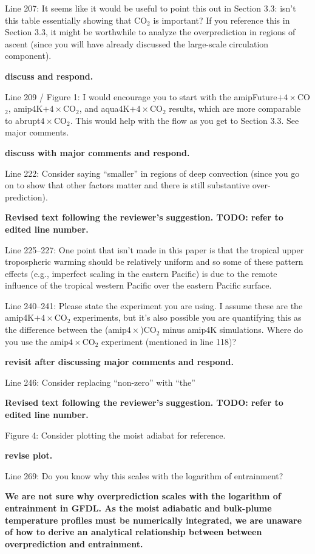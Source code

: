 \documentclass[11pt]{article}
\begin{document}
Line 207: It seems like it would be useful to point this out in Section 3.3: isn't this table essentially showing that CO\(_2\) is important? If you reference this in Section 3.3, it might be worthwhile to analyze the overprediction in regions of ascent (since you will have already discussed the large-scale circulation component).

\textbf{discuss and respond.}

Line 209 / Figure 1: I would encourage you to start with the amipFuture\(+4\times\)CO\(_2\), amip4K\(+4\times\)CO\(_2\), and aqua4K\(+4\times\)CO\(_2\) results, which are more comparable to abrupt\(4\times\)CO\(_2\). This would help with the flow as you get to Section 3.3. See major comments.

\textbf{discuss with major comments and respond.}

Line 222: Consider saying ``smaller'' in regions of deep convection (since you go on to show that other factors matter and there is still substantive over-prediction).

\textbf{Revised text following the reviewer's suggestion. TODO: refer to edited line number.}

Line 225--227: One point that isn't made in this paper is that the tropical upper tropospheric warming should be relatively uniform and so some of these pattern effects (e.g., imperfect scaling in the eastern Pacific) is due to the remote influence of the tropical western Pacific over the eastern Pacific surface.

Line 240--241: Please state the experiment you are using. I assume these are the amip4K\(+4\times\)CO\(_2\) experiments, but it's also possible you are quantifying this as the difference between the (amip\(4\times\))CO\(_2\) minus amip4K simulations. Where do you use the amip\(4\times\)CO\(_2\) experiment (mentioned in line 118)?

\textbf{revisit after discussing major comments and respond.}

Line 246: Consider replacing ``non-zero'' with ``the''

\textbf{Revised text following the reviewer's suggestion. TODO: refer to edited line number.}

Figure 4: Consider plotting the moist adiabat for reference.

\textbf{revise plot.}

Line 269: Do you know why this scales with the logarithm of entrainment?

\textbf{We are not sure why overprediction scales with the logarithm of entrainment in GFDL. As the moist adiabatic and bulk-plume temperature profiles must be numerically integrated, we are unaware of how to derive an analytical relationship between between overprediction and entrainment.}
\end{document}
